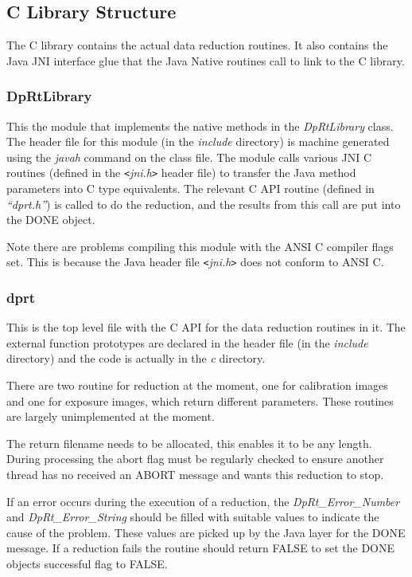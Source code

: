 \documentclass[10pt,a4paper]{article}
\begin{document}
\subsection{C Library Structure}
The C library contains the actual data reduction routines. It also contains the Java JNI interface glue that the 
Java Native routines call to link to the C library.

\subsubsection{DpRtLibrary}
This the module that implements the native methods in the {\em DpRtLibrary} class. The header file for this 
module (in the {\em include} directory) is machine generated using the {\em javah} command on the class file. 
The module calls various JNI C routines (defined in the {\em \verb'<'jni.h\verb'>'} header file) to transfer the Java method
parameters into C type equivalents. The relevant C API routine (defined in {\em ``dprt.h''}) is called to
do the reduction, and the results from this call are put into the DONE object. 

Note there are problems compiling this module with the ANSI C compiler flags set. This is because the Java
header file {\em \verb'<'jni.h\verb'>'} does not conform to ANSI C.

\subsubsection{dprt}
This is the top level file with the C API for the data reduction routines in it. The external function
prototypes are declared in the header file (in the {\em include} directory) and the code is actually in the
{\em c} directory. 

There are two routine for reduction at the moment, one for calibration images and one for
exposure images, which return different parameters. These routines are largely unimplemented at the moment.

The return filename needs to be allocated, this enables
it to be any length. During processing the abort flag must be regularly checked to ensure another thread
has no received an ABORT message and wants this reduction to stop.

If an error occurs during the execution of a reduction, the {\em DpRt\_Error\_Number} and {\em DpRt\_Error\_String}
should be filled with suitable values to indicate the cause of the problem. These values are picked up
by the Java layer for the DONE message. If a reduction fails the routine should return FALSE to
set the DONE objects successful flag to FALSE.
\end{document}
